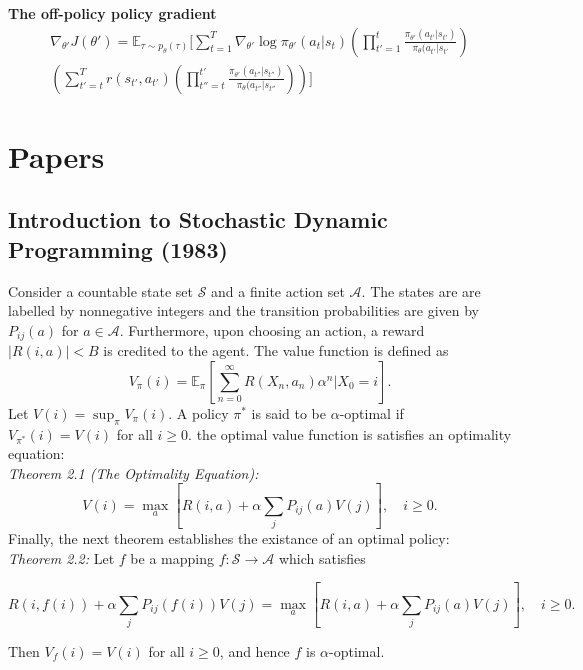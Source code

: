 \documentclass[a4paper, fontsize=8pt, landscape, DIV=1]{scrartcl}
\begin{document}
\begin{multicols*}{3}
\textbf{The off-policy policy gradient}\\[3pt]
\begin{align*}
\nabla_{\theta'}J(\theta')=\mathbb{E}_{\tau\sim p_{\theta}(\tau)}\Bigg[\sum\limits_{t=1}^{T}\nabla_{\theta'}\log\pi_{\theta'}(a_t|s_t)\left(\prod\limits_{t'=1}^{t}\frac{\pi_{\theta'}(a_{t'}|s_{t'})}{\pi_{\theta}(a_{t'}|s_{t'}}\right) \\
\left(\sum\limits_{t'=t}^{T}r(s_{t'},a_{t'})\left(\prod\limits_{t''=t}^{t'}\frac{\pi_{\theta'}(a_{t''}|s_{t''})}{\pi_{\theta}(a_{t''}|s_{t''}}\right)\right)\Bigg]
\end{align*}

\section{Papers}
\subsection{Introduction to Stochastic Dynamic Programming (1983)}
Consider a countable state set $\mathcal{S}$ and a finite action set $\mathcal{A}$. The states are are labelled by nonnegative integers and the transition probabilities are given by $P_{ij}(a)$ for $a\in\mathcal{A}$. Furthermore, upon choosing an action, a reward $|R(i,a)|<B$ is credited to the agent. The value function is defined as
\begin{equation*}
V_{\pi}(i)=\mathbb{E}_{\pi}\left[\sum\limits_{n=0}^{\infty}R(X_n,a_n)\alpha^n|X_0=i\right].
\end{equation*}
Let $V(i)=\sup_{\pi}V_{\pi}(i)$. A policy $\pi^*$ is said to be $\alpha$-optimal if $V_{\pi^*}(i)=V(i)$ for all $i\ge 0$. the optimal value function is satisfies an optimality equation:\\[3pt]
\textit{Theorem 2.1 (The Optimality Equation):} 
\begin{equation*}
V(i)=\max_a[R(i,a)+\alpha\sum_jP_{ij}(a)V(j)],\quad i\ge 0.
\end{equation*}
Finally, the next theorem establishes the existance of an optimal policy:\\[3pt]
\textit{Theorem 2.2:} Let $f$ be a mapping $f:\mathcal{S}\rightarrow\mathcal{A}$ which satisfies
\begin{small}
\begin{equation*}
R(i,f(i))+\alpha\sum_jP_{ij}(f(i))V(j)=\max_a[R(i,a)+\alpha\sum_jP_{ij}(a)V(j)],\quad i\ge 0.
\end{equation*}
\end{small}
Then $V_f(i)=V(i)$ for all $i\ge 0$, and hence $f$ is $\alpha$-optimal.


\end{multicols*}
\end{document}
